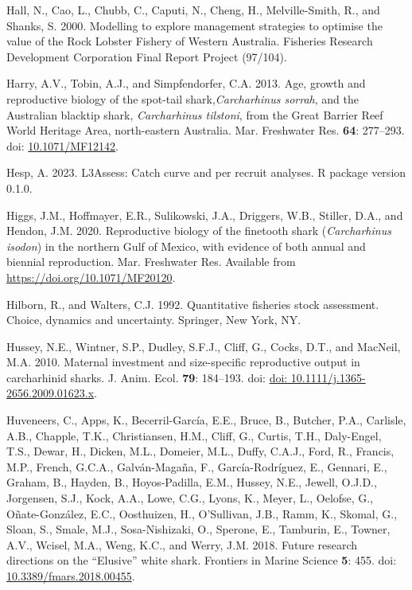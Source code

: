 \documentclass[
]{article}
\newenvironment{CSLReferences}%
  {}%
  {\par}
\begin{document}
\begin{CSLReferences}{1}{0}
Hall, N., Cao, L., Chubb, C., Caputi, N., Cheng, H., Melville-Smith, R., and Shanks, S. 2000. Modelling to explore management strategies to optimise the value of the {Rock} {Lobster} {Fishery} of {Western} {Australia}. Fisheries Research Development Corporation Final Report Project (97/104).

Harry, A.V., Tobin, A.J., and Simpfendorfer, C.A. 2013. Age, growth and reproductive biology of the spot-tail shark,\emph{{Carcharhinus} sorrah}, and the {Australian} blacktip shark, \emph{{Carcharhinus} tilstoni}, from the {Great} {Barrier} {Reef} {World} {Heritage} {Area}, north-eastern {Australia}. Mar. Freshwater Res. \textbf{64}: 277--293. doi: \href{https://doi.org/10.1071/MF12142}{10.1071/MF12142}.

Hesp, A. 2023. {L3Assess}: {Catch} curve and per recruit analyses. R package version 0.1.0.

Higgs, J.M., Hoffmayer, E.R., Sulikowski, J.A., Driggers, W.B., Stiller, D.A., and Hendon, J.M. 2020. Reproductive biology of the finetooth shark (\emph{{Carcharhinus} isodon}) in the northern {Gulf} of {Mexico}, with evidence of both annual and biennial reproduction. Mar. Freshwater Res. Available from \url{https://doi.org/10.1071/MF20120}.

Hilborn, R., and Walters, C.J. 1992. Quantitative fisheries stock assessment. Choice, dynamics and uncertainty. Springer, New York, NY.

Hussey, N.E., Wintner, S.P., Dudley, S.F.J., Cliff, G., Cocks, D.T., and MacNeil, M.A. 2010. Maternal investment and size-specific reproductive output in carcharhinid sharks. J. Anim. Ecol. \textbf{79}: 184--193. doi: \href{https://doi.org/doi:\%2010.1111/j.1365-2656.2009.01623.x}{doi: 10.1111/j.1365-2656.2009.01623.x}.

Huveneers, C., Apps, K., Becerril-García, E.E., Bruce, B., Butcher, P.A., Carlisle, A.B., Chapple, T.K., Christiansen, H.M., Cliff, G., Curtis, T.H., Daly-Engel, T.S., Dewar, H., Dicken, M.L., Domeier, M.L., Duffy, C.A.J., Ford, R., Francis, M.P., French, G.C.A., Galván-Magaña, F., García-Rodríguez, E., Gennari, E., Graham, B., Hayden, B., Hoyos-Padilla, E.M., Hussey, N.E., Jewell, O.J.D., Jorgensen, S.J., Kock, A.A., Lowe, C.G., Lyons, K., Meyer, L., Oelofse, G., Oñate-González, E.C., Oosthuizen, H., O'Sullivan, J.B., Ramm, K., Skomal, G., Sloan, S., Smale, M.J., Sosa-Nishizaki, O., Sperone, E., Tamburin, E., Towner, A.V., Wcisel, M.A., Weng, K.C., and Werry, J.M. 2018. Future research directions on the {``{Elusive}''} white shark. Frontiers in Marine Science \textbf{5}: 455. doi: \href{https://doi.org/10.3389/fmars.2018.00455}{10.3389/fmars.2018.00455}.


\end{CSLReferences}
\end{document}
